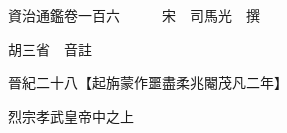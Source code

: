










 


 
 


 

  
  
  
  
  





  
  
  
  
  
 
  

  

  
  
  



  

 
 

  
   




  

  
  


  　　資治通鑑卷一百六　　　宋　司馬光　撰

　　胡三省　音註

　　晉紀二十八【起旃蒙作噩盡柔兆閹茂凡二年】

　　烈宗孝武皇帝中之上

